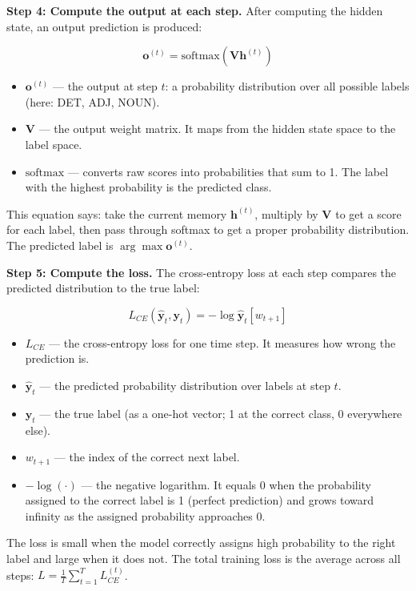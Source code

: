 \medskip
\noindent\textbf{Step 4: Compute the output at each step.}
After computing the hidden state, an output prediction is produced:

\[
\mathbf{o}^{(t)} = \text{softmax}\!\left(\mathbf{V}\mathbf{h}^{(t)}\right)
\]

\begin{itemize}
  \item $\mathbf{o}^{(t)}$ --- the output at step $t$: a probability distribution over
        all possible labels (here: DET, ADJ, NOUN).
  \item $\mathbf{V}$ --- the output weight matrix. It maps from the hidden state space
        to the label space.
  \item $\text{softmax}$ --- converts raw scores into probabilities that sum to 1.
        The label with the highest probability is the predicted class.
\end{itemize}

This equation says: take the current memory $\mathbf{h}^{(t)}$, multiply by $\mathbf{V}$
to get a score for each label, then pass through softmax to get a proper probability
distribution. The predicted label is $\arg\max \mathbf{o}^{(t)}$.

\medskip
\noindent\textbf{Step 5: Compute the loss.}
The cross-entropy loss at each step compares the predicted distribution to the true label:

\[
L_{CE}\!\left(\hat{\mathbf{y}}_t, \mathbf{y}_t\right) = -\log \hat{\mathbf{y}}_t[w_{t+1}]
\]

\begin{itemize}
  \item $L_{CE}$ --- the cross-entropy loss for one time step. It measures how wrong the
        prediction is.
  \item $\hat{\mathbf{y}}_t$ --- the predicted probability distribution over labels at
        step $t$.
  \item $\mathbf{y}_t$ --- the true label (as a one-hot vector; 1 at the correct class,
        0 everywhere else).
  \item $w_{t+1}$ --- the index of the correct next label.
  \item $-\log(\cdot)$ --- the negative logarithm. It equals 0 when the probability
        assigned to the correct label is 1 (perfect prediction) and grows toward infinity
        as the assigned probability approaches 0.
\end{itemize}

The loss is small when the model correctly assigns high probability to the right label
and large when it does not. The total training loss is the average across all steps:
$L = \frac{1}{T}\sum_{t=1}^{T} L_{CE}^{(t)}$.

